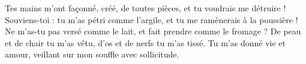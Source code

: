 \lettrine{T}{}es mains m’ont façonné, créé, de toutes pièces, et tu voudrais me détruire !
Souviens-toi : tu m’as pétri comme l’argile, et tu me ramènerais à la poussière !
Ne m’as-tu pas versé comme le lait, et fait prendre comme le fromage ?
De peau et de chair tu m’as vêtu, d’os et de nerfs tu m’as tissé.
Tu m’as donné vie et amour, veillant sur mon souffle avec sollicitude.